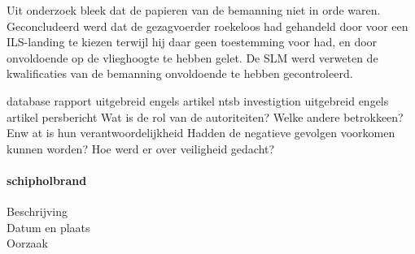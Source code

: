 Uit onderzoek bleek dat de papieren van de bemanning niet in orde waren. 
Geconcludeerd werd dat de gezagvoerder roekeloos had gehandeld door voor een ILS-landing te kiezen terwijl hij daar geen toestemming voor had, en door onvoldoende op de vlieghoogte te hebben gelet. 
De SLM werd verweten de kwalificaties van de bemanning onvoldoende te hebben gecontroleerd.

 

\cite{espnSLMterugblik}
\cite{dennisRosier01052020}
\cite{hassing07062020slmramp}
\cite{amsterdamArchiefSLM}
\cite{rtvOost06062019nabestaande}
\cite{breda07062021AndroSnel}
\cite{andereTijdenSLMCrash}
database
\cite{aviationReport}
rapport
\cite{aviationSLMCrashAccidentInvestigation}
\cite{mcDonnelDouglasCommissionReportSLMCrash}
\cite{wikiSRFlight764}
\cite{nos07062019SLMTerugblik}
\cite{dagvantoenSLMCrash}
\cite{waterkantNesty07061989}
uitgebreid engels artikel
\cite{eduNandlalSRCrash}
ntsb investigtion
\cite{oldjetsSRAirways}
uitgebreid engels artikel
\cite{cloudberg02012021srflight764}
persbericht
\cite{apnews07061989srplanecrash}
Wat is de rol van de autoriteiten?
Welke andere betrokkeen? Enw at is hun verantwoordelijkheid
Hadden de negatieve gevolgen voorkomen kunnen worden?
Hoe werd er over veiligheid gedacht?



\paragraph{schipholbrand}

\begin{description}
\item[Beschrijving]
\item[Datum en plaats] 
\item[Oorzaak]
\end{description}

